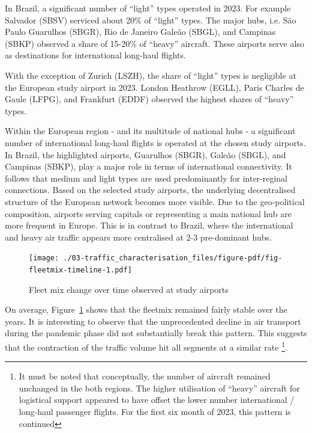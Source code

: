 \documentclass[
  a4paper,
  DIV=11,
  numbers=noendperiod]{scrreport}
\begin{document}
In Brazil, a significant number of ``light'' types operated in 2023. For
example Salvador (SBSV) serviced about 20\% of ``light'' types. The
major hubs, i.e. São Paulo Guarulhos (SBGR), Rio de Janeiro Galeão
(SBGL), and Campinas (SBKP) observed a share of 15-20\% of ``heavy''
aircraft. These airports serve also as destinations for international
long-haul flights.

With the exception of Zurich (LSZH), the share of ``light'' types is
negligible at the European study airport in 2023. London Heathrow
(EGLL), Paris Charles de Gaule (LFPG), and Frankfurt (EDDF) observed the
highest shares of ``heavy'' types.

Within the European region - and its multitude of national hubs - a
significant number of international long-haul flights is operated at the
chosen study airports. In Brazil, the highlighted airports, Guarulhos
(SBGR), Galeão (SBGL), and Campinas (SBKP), play a major role in terms
of international connectivity. It follows that medium and light types
are used predominantly for inter-reginal connections. Based on the
selected study airports, the underlying decentralised structure of the
European network becomes more visible. Due to the geo-political
composition, airports serving capitals or representing a main national
hub are more frequent in Europe. This is in contrast to Brazil, where
the international and heavy air traffic appears more centralised at 2-3
pre-dominant hubs.

\begin{figure}[H]

{\centering \texttt{[image: ./03-traffic\_characterisation\_files/figure-pdf/fig-fleetmix-timeline-1.pdf]}

}

\caption{\label{fig-fleetmix-timeline}Fleet mix change over time
observed at study airports}

\end{figure}

On average, Figure~\ref{fig-fleetmix-timeline} shows that the fleetmix
remained fairly stable over the years. It is interesting to observe that
the unprecedented decline in air transport during the pandemic phase did
not substantially break this pattern. This suggests that the contraction
of the traffic volume hit all segments at a similar rate \footnote{It
  must be noted that conceptually, the number of aircraft remained
  unchanged in the both regions. The higher utilisation of ``heavy''
  aircraft for logistical support appeared to have offset the lower
  number international / long-haul passenger flights. For the first six
  month of 2023, this pattern is continued}.
\end{document}
